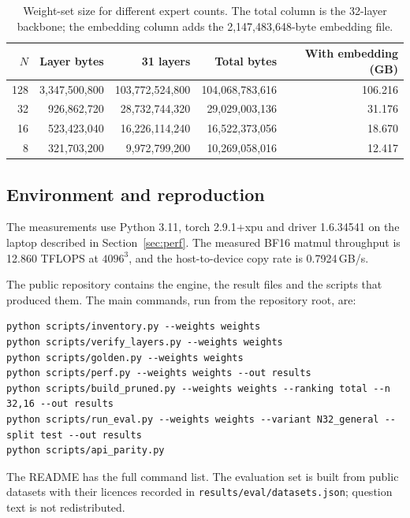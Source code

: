 \documentclass[11pt,a4paper]{article}
\begin{document}
\begin{table}[!htbp]
\centering
\small
\caption{Weight-set size for different expert counts. The total column is the 32-layer backbone; the embedding column adds the 2,147,483,648-byte embedding file.}
\label{tab:sizes}
\begin{tabular}{rrrrr}
\toprule
$N$ & Layer bytes & 31 layers & Total bytes & With embedding (GB) \\
\midrule
128 & 3,347,500,800 & 103,772,524,800 & 104,068,783,616 & 106.216 \\
32 & 926,862,720 & 28,732,744,320 & 29,029,003,136 & 31.176 \\
16 & 523,423,040 & 16,226,114,240 & 16,522,373,056 & 18.670 \\
8 & 321,703,200 & 9,972,799,200 & 10,269,058,016 & 12.417 \\
\bottomrule
\end{tabular}
\end{table}

\subsection{Environment and reproduction}

The measurements use Python 3.11, torch 2.9.1+xpu and driver 1.6.34541 on the laptop described in Section~\ref{sec:perf}. The measured BF16 matmul throughput is 12.860 TFLOPS at $4096^3$, and the host-to-device copy rate is 0.7924\,GB/s.

The public repository contains the engine, the result files and the scripts that produced them. The main commands, run from the repository root, are:
{\footnotesize
\begin{verbatim}
python scripts/inventory.py --weights weights
python scripts/verify_layers.py --weights weights
python scripts/golden.py --weights weights
python scripts/perf.py --weights weights --out results
python scripts/build_pruned.py --weights weights --ranking total --n 32,16 --out results
python scripts/run_eval.py --weights weights --variant N32_general --split test --out results
python scripts/api_parity.py
\end{verbatim}}
The README has the full command list. The evaluation set is built from public datasets with their licences recorded in \texttt{results/eval/datasets.json}; question text is not redistributed.


\begingroup
\scriptsize
\setlength{\bibsep}{0pt}

\endgroup
\end{document}
